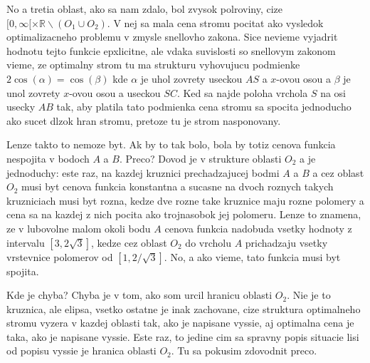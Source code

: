 \documentclass[12pt]{book}
\begin{document}
No a tretia oblast, ako sa nam zdalo, bol zvysok polroviny, cize
    $[0,\infty[\times\mathbb{R}\smallsetminus(O_{1}\cup O_{2})$.
V nej sa mala cena stromu pocitat ako vysledok optimalizacneho problemu v
    zmysle snellovho zakona.
Sice nevieme vyjadrit hodnotu tejto funkcie epxlicitne, ale vdaka suvislosti
    so snellovym zakonom vieme, ze optimalny strom tu ma strukturu vyhovujucu
    podmienke $2\cos(\alpha)=\cos(\beta)$ kde $\alpha$ je uhol zovrety useckou
    $AS$ a $x$-ovou osou a $\beta$ je unol zovrety $x$-ovou osou a useckou
    $SC$.
Ked sa najde poloha vrchola $S$ na osi usecky $AB$ tak, aby platila tato
    podmienka cena stromu sa spocita jednoducho ako sucet dlzok hran
    stromu, pretoze tu je strom nasponovany.

Lenze takto to nemoze byt.
Ak by to tak bolo, bola by totiz cenova funkcia nespojita v bodoch $A$ a $B$.
Preco?
Dovod je v strukture oblasti $O_{2}$ a je jednoduchy: este raz, na kazdej
    kruznici prechadzajucej bodmi $A$ a $B$ a cez oblast $O_{2}$ musi byt
    cenova funkcia konstantna a sucasne na dvoch roznych takych kruzniciach
    musi byt rozna, kedze dve rozne take kruznice maju rozne polomery a cena
    sa na kazdej z nich pocita ako trojnasobok jej polomeru.
Lenze to znamena, ze v lubovolne malom okoli bodu $A$ cenova funkcia nadobuda
    vsetky hodnoty z intervalu $[3,2\sqrt{3}]$, kedze cez oblast $O_{2}$ do
    vrcholu $A$ prichadzaju vsetky vrstevnice polomerov od $[1,2/\sqrt{3}]$.
No, a ako vieme, tato funkcia musi byt spojita.

Kde je chyba?
Chyba je v tom, ako som urcil hranicu oblasti $O_{2}$.
Nie je to kruznica, ale elipsa, vsetko ostatne je inak zachovane, cize
    struktura optimalneho stromu vyzera v kazdej oblasti tak, ako je napisane
    vyssie, aj optimalna cena je taka, ako je napisane vyssie.
Este raz, to jedine cim sa spravny popis situacie lisi od popisu vyssie je
    hranica oblasti $O_{2}$.
Tu sa pokusim zdovodnit preco.
\end{document}
